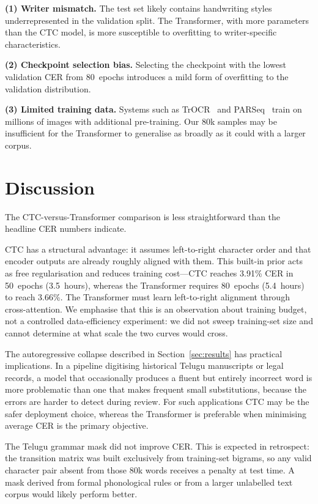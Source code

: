 \documentclass[conference]{IEEEtran}
\begin{document}
\textbf{(1) Writer mismatch.} The test set likely contains handwriting styles underrepresented in the validation split. The Transformer, with more parameters than the CTC model, is more susceptible to overfitting to writer-specific characteristics.

\textbf{(2) Checkpoint selection bias.} Selecting the checkpoint with the lowest validation CER from 80~epochs introduces a mild form of overfitting to the validation distribution.

\textbf{(3) Limited training data.} Systems such as TrOCR~\cite{li2023trocr} and PARSeq~\cite{bautista2022parseq} train on millions of images with additional pre-training. Our 80k samples may be insufficient for the Transformer to generalise as broadly as it could with a larger corpus.

\section{Discussion}

The CTC-versus-Transformer comparison is less straightforward than the headline CER numbers indicate.

CTC has a structural advantage: it assumes left-to-right character order and that encoder outputs are already roughly aligned with them. This built-in prior acts as free regularisation and reduces training cost---CTC reaches 3.91\% CER in 50~epochs (3.5~hours), whereas the Transformer requires 80~epochs (5.4~hours) to reach 3.66\%. The Transformer must learn left-to-right alignment through cross-attention. We emphasise that this is an observation about training budget, not a controlled data-efficiency experiment: we did not sweep training-set size and cannot determine at what scale the two curves would cross.

The autoregressive collapse described in Section~\ref{sec:results} has practical implications. In a pipeline digitising historical Telugu manuscripts or legal records, a model that occasionally produces a fluent but entirely incorrect word is more problematic than one that makes frequent small substitutions, because the errors are harder to detect during review. For such applications CTC may be the safer deployment choice, whereas the Transformer is preferable when minimising average CER is the primary objective.

The Telugu grammar mask did not improve CER. This is expected in retrospect: the transition matrix was built exclusively from training-set bigrams, so any valid character pair absent from those 80k words receives a penalty at test time. A mask derived from formal phonological rules or from a larger unlabelled text corpus would likely perform better.
\end{document}
